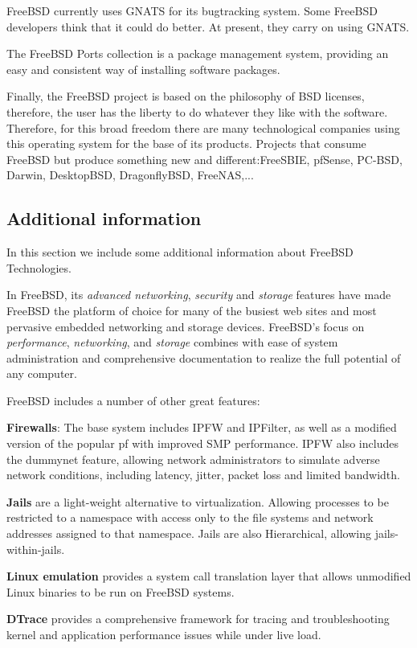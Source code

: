 \documentclass[11pt]{article}
\begin{document}
FreeBSD currently uses GNATS for its bugtracking system. Some FreeBSD developers think that it could do better. At present, they carry on using GNATS.

The FreeBSD Ports collection is a package management system, providing an easy and consistent way of installing software packages. 

Finally, the FreeBSD project is based on the philosophy of BSD licenses, therefore, the user has the liberty to do whatever they like with the software. Therefore, for this broad freedom there are many technological companies using this operating system for the base of its products. Projects that consume FreeBSD but produce something new and different:FreeSBIE, pfSense, PC-BSD, Darwin, DesktopBSD, DragonflyBSD, FreeNAS,...

\subsection{Additional information}
In this section we include some additional information about FreeBSD Technologies.

In FreeBSD, its \emph{advanced networking}, \emph{security} and \emph{storage} features have made FreeBSD the platform of choice for many of the busiest web sites and most pervasive embedded networking and storage devices. FreeBSD's focus on \emph{performance}, \emph{networking}, and \emph{storage} combines with ease of system administration and comprehensive documentation to realize the full potential of any computer.

FreeBSD includes a number of other great features:

    \textbf{Firewalls}: The base system includes IPFW and IPFilter, as well as a modified version of the popular pf with improved SMP performance. IPFW also includes the dummynet feature, allowing network administrators to simulate adverse network conditions, including latency, jitter, packet loss and limited bandwidth.
    
    \textbf{Jails} are a light-weight alternative to virtualization. Allowing processes to be restricted to a namespace with access only to the file systems and network addresses assigned to that namespace. Jails are also Hierarchical, allowing jails-within-jails.  
    
    \textbf{Linux emulation }provides a system call translation layer that allows unmodified Linux binaries to be run on FreeBSD systems. 
    
    \textbf{DTrace} provides a comprehensive framework for tracing and troubleshooting kernel and application performance issues while under live load.
    
\end{document}
